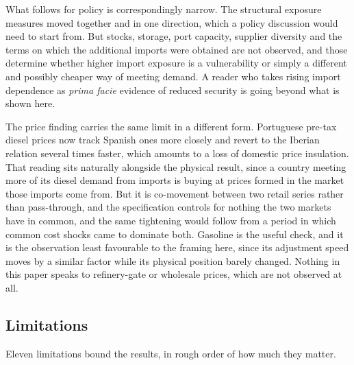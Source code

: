 \documentclass[11pt,a4paper]{article}
\begin{document}
What follows for policy is correspondingly narrow. The structural exposure measures moved
together and in one direction, which a policy discussion would need to start from. But stocks,
storage, port capacity, supplier diversity and the terms on which the additional imports were
obtained are not observed, and those determine whether higher import exposure is a vulnerability
or simply a different and possibly cheaper way of meeting demand. A reader who takes rising
import dependence as \emph{prima facie} evidence of reduced security is going beyond what is
shown here.

The price finding carries the same limit in a different form. Portuguese pre-tax diesel prices
now track Spanish ones more closely and revert to the Iberian relation several
times faster, which amounts to a loss of domestic price insulation. That reading sits naturally
alongside the physical result, since a country meeting more of its diesel demand from imports is
buying at prices formed in the market those imports come from. But it is co-movement between two
retail series rather than pass-through, and the specification controls for nothing the two
markets have in common, and the same tightening would follow from a period in which common cost shocks came to
dominate both. Gasoline is the useful check, and it is the observation least favourable to the
framing here, since its adjustment speed moves by a similar factor while its physical position
barely changed. Nothing in this paper speaks to refinery-gate or wholesale prices, which are not
observed at all.

\subsection{Limitations}

Eleven limitations bound the results, in rough order of how much they matter.
\end{document}
